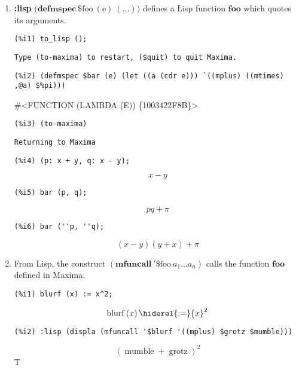 \documentclass[12pt,leqno]{article}
\begin{document}
\begin{enumerate}
\item {\bf :lisp} $\mathrm{(}\mathbf{defmspec\ } \mathrm{\$foo\ (e)\ (\ldots))}$
defines a Lisp function $\mathbf{foo}$ which quotes its arguments.
\begin{verbatim}
(%i1) to_lisp ();
\end{verbatim}
\begin{Verbatim}
Type (to-maxima) to restart, ($quit) to quit Maxima.
\end{Verbatim}
\begin{verbatim}
(%i2) (defmspec $bar (e) (let ((a (cdr e))) `((mplus) ((mtimes) ,@a) $%pi)))
\end{verbatim}
\#\textless FUNCTION (LAMBDA (E)) \{1003422F8B\}\textgreater 
\begin{verbatim}
(%i3) (to-maxima)
\end{verbatim}
\begin{Verbatim}
Returning to Maxima
\end{Verbatim}
\begin{verbatim}
(%i4) (p: x + y, q: x - y);
\end{verbatim}
\begin{dmath}[number={\(\mathop{\mathrm{\%o}_{2}}\)}]
x-y
\end{dmath}
\begin{verbatim}
(%i5) bar (p, q);
\end{verbatim}
\begin{dmath}[number={\(\mathop{\mathrm{\%o}_{3}}\)}]
p q+\pi
\end{dmath}
\begin{verbatim}
(%i6) bar (''p, ''q);
\end{verbatim}
\begin{dmath}[number={\(\mathop{\mathrm{\%o}_{4}}\)}]
\left(x-y\right) \left(y+x\right)+\pi
\end{dmath}


\item From Lisp, the construct $(\mathbf{mfuncall\ '\$}\mathrm{foo\ }a_1 \ldots a_n)$
calls the function $\mathbf{foo}$ defined in Maxima.

\begin{verbatim}
(%i1) blurf (x) := x^2;
\end{verbatim}
\begin{dmath}[number={\(\mathop{\mathrm{\%o}_{1}}\)}]
\mathop{\mathrm{blurf}}\left(x\right) \hiderel{:=} {x}^{2}
\end{dmath}
\begin{verbatim}
(%i2) :lisp (displa (mfuncall '$blurf '((mplus) $grotz $mumble)))
\end{verbatim}
\begin{dmath*}
{\left(\mathop{\mathrm{mumble}}+\mathop{\mathrm{grotz}}\right)}^{2}
\end{dmath*}
T

\end{enumerate}
\end{document}
